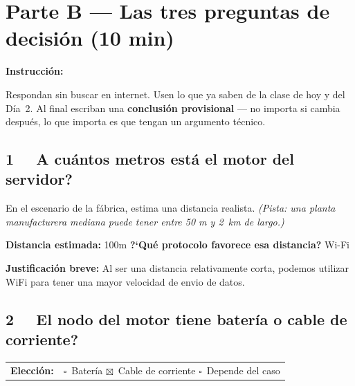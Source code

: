 \documentclass[11pt, letterpaper]{article}
\newenvironment{instruccion}{%
  \begin{mdframed}[backgroundcolor=tealLight, linecolor=tealMain, linewidth=1pt,
    innerleftmargin=10pt, innerrightmargin=10pt,
    innertopmargin=6pt,  innerbottommargin=6pt]
  \small\textbf{\color{tealMain}Instrucci\'on:}\hspace{4pt}
}{\end{mdframed}}
\begin{document}
\newpage

\section{Parte B --- Las tres preguntas de decisi\'on (10 min)}

\begin{instruccion}
  Respondan sin buscar en internet. Usen lo que ya saben de la clase de hoy y del
  D\'ia~2. Al final escriban una \textbf{conclusi\'on provisional} --- no importa
  si cambia despu\'es, lo que importa es que tengan un argumento t\'ecnico.
\end{instruccion}

\vspace{0.3cm}

\subsection{%
  \texorpdfstring{%
    \textcolor{roseMain}{1}~~%
    \textquestiondown A cu\'antos metros est\'a el motor del servidor?%
  }{Pregunta 1}%
}

En el escenario de la f\'abrica, estima una distancia realista.
\textit{(Pista: una planta manufacturera mediana puede tener entre 50 m y 2~km de largo.)}

\vspace{0.2cm}
\textbf{Distancia estimada:} 100m
\hspace{1cm}
\textbf{?`Qu\'e protocolo favorece esa distancia?} Wi-Fi

\vspace{0.2cm}
\textbf{Justificaci\'on breve:} Al ser una distancia relativamente corta, podemos utilizar WiFi para tener una mayor velocidad de envio de datos.

\subsection{%
  \texorpdfstring{%
    \textcolor{roseMain}{2}~~%
    \textquestiondown El nodo del motor tiene bater\'ia o cable de corriente?%
  }{Pregunta 2}%
}

\begin{tabular}{ll}
  \textbf{Elecci\'on:} &
  $\square$~Bater\'ia \quad $\boxtimes$~Cable de corriente \quad
  $\square$~Depende del caso \\[0.6em]
\end{tabular}
\end{document}
